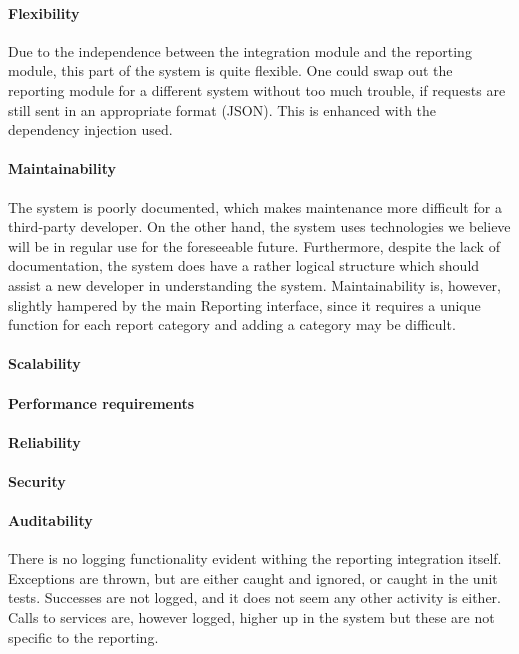 \documentclass{article}
\begin{document}
		 	\paragraph{Flexibility}
		 	Due to the independence between the integration module and the reporting module, this part of the system is quite flexible. One could swap out the reporting module for a different system without too much trouble, if requests are still sent in an appropriate format (JSON). This is enhanced with the dependency injection used.
            \paragraph{Maintainability}
            The system is poorly documented, which makes maintenance more difficult for a third-party developer. On the other hand, the system uses technologies we believe will be in regular use for the foreseeable future. Furthermore, despite the lack of documentation, the system does have a rather logical structure which should assist a new developer in understanding the system. Maintainability is, however, slightly hampered by the main Reporting interface, since it requires a unique function for each report category and adding a category may be difficult.
            \paragraph{Scalability}
            \paragraph{Performance requirements}
            \paragraph{Reliability}
            \paragraph{Security}
            \paragraph{Auditability}
            There is no logging functionality evident withing the reporting integration itself. Exceptions are thrown, but are either caught and ignored, or caught in the unit tests. Successes are not logged, and it does not seem any other activity is either. Calls to services are, however logged, higher up in the system but these are not specific to the reporting.
\end{document}
